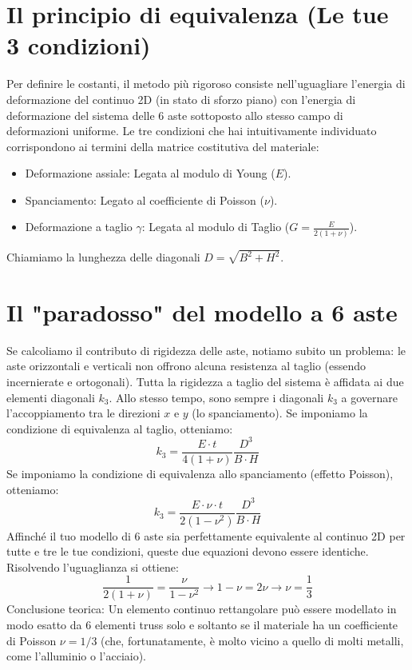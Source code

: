\documentclass[a4paper]{article}
\begin{document}
\section{Il principio di equivalenza (Le tue 3 condizioni)}

Per definire le costanti, il metodo più rigoroso consiste nell'uguagliare l'energia di deformazione del continuo 2D (in stato di sforzo piano) con l'energia di deformazione del sistema delle 6 aste sottoposto allo stesso campo di deformazioni uniforme.
Le tre condizioni che hai intuitivamente individuato corrispondono ai termini della matrice costitutiva del materiale:
\begin{itemize}
\item Deformazione assiale: Legata al modulo di Young ($E$).
\item Spanciamento: Legato al coefficiente di Poisson ($\nu$).
\item Deformazione a taglio $\gamma$: Legata al modulo di Taglio ($G = \frac{E}{2(1+\nu)}$).
\end{itemize}
Chiamiamo la lunghezza delle diagonali $D = \sqrt{B^2 + H^2}$.


\section{Il "paradosso" del modello a 6 aste}

Se calcoliamo il contributo di rigidezza delle aste, notiamo subito un problema: le aste orizzontali e verticali non offrono alcuna resistenza al taglio (essendo incernierate e ortogonali). Tutta la rigidezza a taglio del sistema è affidata ai due elementi diagonali $k_3$. Allo stesso tempo, sono sempre i diagonali $k_3$ a governare l'accoppiamento tra le direzioni $x$ e $y$ (lo spanciamento).
Se imponiamo la condizione di equivalenza al taglio, otteniamo:
$$k_3 = \frac{E \cdot t}{4(1+\nu)} \frac{D^3}{B \cdot H}$$
Se imponiamo la condizione di equivalenza allo spanciamento (effetto Poisson), otteniamo:
$$k_3 = \frac{E \cdot \nu \cdot t}{2(1-\nu^2)} \frac{D^3}{B \cdot H}$$
Affinché il tuo modello di 6 aste sia perfettamente equivalente al continuo 2D per tutte e tre le tue condizioni, queste due equazioni devono essere identiche. Risolvendo l'uguaglianza si ottiene:
$$\frac{1}{2(1+\nu)} = \frac{\nu}{1-\nu^2} \rightarrow 1-\nu = 2\nu \rightarrow \nu = \frac{1}{3}$$
Conclusione teorica: Un elemento continuo rettangolare può essere modellato in modo esatto da 6 elementi truss solo e soltanto se il materiale ha un coefficiente di Poisson $\nu = 1/3$ (che, fortunatamente, è molto vicino a quello di molti metalli, come l'alluminio o l'acciaio).
\end{document}
